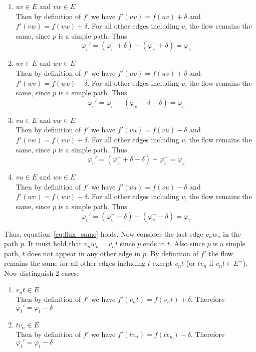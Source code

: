 \documentclass[10pt,a4paper]{article}
\begin{document}
	\begin{enumerate}
		\item $uv \in E$ and $vw \in E$ \\
		Then by definition of $f'$ we have $f'(uv) = f(uv) + \delta$ and $f'(vw) = f(vw) + \delta$. For all other edges including $v$, the flow remains the same, since $p$ is a simple path. Thus 
		$$\varphi_v' = (\varphi_v^+ + \delta) - (\varphi_v^- + \delta) = \varphi_v$$
		
		\item $uv \in E$ and $wv \in E$ \\
		Then by definition of $f'$ we have $f'(uv) = f(uv) + \delta$ and $f'(wv) = f(wv) - \delta$. For all other edges including $v$, the flow remains the same, since $p$ is a simple path. Thus 
		$$\varphi_v' = \varphi_v^+ - (\varphi_v^- + \delta - \delta)= \varphi_v$$

		\item $vu \in E$ and $vw \in E$ \\
		Then by definition of $f'$ we have $f'(vu) = f(vu) - \delta$ and $f'(vw) = f(vw) + \delta$. For all other edges including $v$, the flow remains the same, since $p$ is a simple path. Thus 
		$$\varphi_v' = (\varphi_v^+ + \delta - \delta) - \varphi_v^- = \varphi_v$$
		
		\item $vu \in E$ and $wv \in E$ \\
		Then by definition of $f'$ we have $f'(vu) = f(vu) - \delta$ and $f'(wv) = f(wv) - \delta$. For all other edges including $v$, the flow remains the same, since $p$ is a simple path. Thus 
		$$\varphi_v' = (\varphi_v^+ - \delta) - (\varphi_v^- - \delta) = \varphi_v$$
	\end{enumerate}
	Thus, equation~\ref{eq:flux_same} holds. Now consider the last edge $v_nw_n$ in the path $p$. It must hold that $v_nw_n = v_nt$ since $p$ ends in $t$. Also since $p$ is a simple path, $t$ does not appear in any other edge in $p$. By definition of $f'$ the flow remains the same for all other edges including $t$ except $v_nt$ (or $tv_n$ if $v_nt \in E^-$). Now distinguish 2 cases:
	\begin{enumerate}
		\item $v_nt \in E$ \\
		Then by definition of $f'$ we have $f'(v_nt) = f(v_nt) + \delta$. Therefore $\varphi_t' = \varphi_t - \delta$
		
		\item $tv_n \in E$ \\
		Then by definition of $f'$ we have $f'(tv_n) = f(tv_n) - \delta$. Therefore $\varphi_t' = \varphi_t - \delta$
	\end{enumerate}
\end{document}
